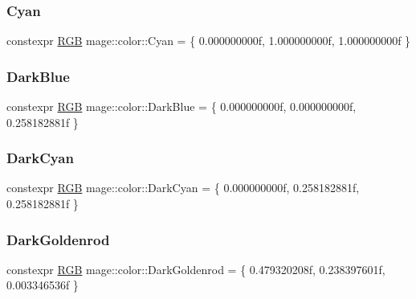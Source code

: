 \subsubsection{\texorpdfstring{Cyan}{Cyan}}
{\footnotesize\ttfamily constexpr \mbox{\hyperlink{structmage_1_1_r_g_b}{R\+GB}} mage\+::color\+::\+Cyan = \{ 0.\+000000000f, 1.\+000000000f, 1.\+000000000f \}}

\mbox{\label{namespacemage_1_1color_abdd3f39d1060d9d691eba6726b5455cc}} 
\subsubsection{\texorpdfstring{Dark\+Blue}{DarkBlue}}
{\footnotesize\ttfamily constexpr \mbox{\hyperlink{structmage_1_1_r_g_b}{R\+GB}} mage\+::color\+::\+Dark\+Blue = \{ 0.\+000000000f, 0.\+000000000f, 0.\+258182881f \}}

\mbox{\label{namespacemage_1_1color_a69f91a91d64036b98384c4d312c848ea}} 
\subsubsection{\texorpdfstring{Dark\+Cyan}{DarkCyan}}
{\footnotesize\ttfamily constexpr \mbox{\hyperlink{structmage_1_1_r_g_b}{R\+GB}} mage\+::color\+::\+Dark\+Cyan = \{ 0.\+000000000f, 0.\+258182881f, 0.\+258182881f \}}

\mbox{\label{namespacemage_1_1color_a50ec8ddc7d55e5286b0b2f01ab690b2b}} 
\subsubsection{\texorpdfstring{Dark\+Goldenrod}{DarkGoldenrod}}
{\footnotesize\ttfamily constexpr \mbox{\hyperlink{structmage_1_1_r_g_b}{R\+GB}} mage\+::color\+::\+Dark\+Goldenrod = \{ 0.\+479320208f, 0.\+238397601f, 0.\+003346536f \}}

\mbox{\label{namespacemage_1_1color_abe66674f72bdb34922b39b4ed1892159}} 
